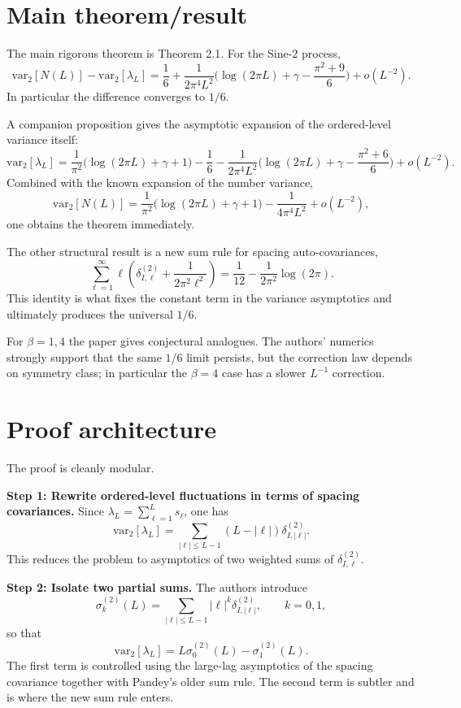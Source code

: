 \documentclass[11pt]{article}
\begin{document}
\section*{Main theorem/result}
The main rigorous theorem is Theorem 2.1. For the Sine-$2$ process,
\[
\mathrm{var}_2[N(L)]-\mathrm{var}_2[\lambda_L]
= \frac16 + \frac{1}{2\pi^4 L^2}\Big(\log(2\pi L)+\gamma-\frac{\pi^2+9}{6}\Big)+o(L^{-2}).
\]
In particular the difference converges to $1/6$.

A companion proposition gives the asymptotic expansion of the ordered-level variance itself:
\[
\mathrm{var}_2[\lambda_L]
= \frac{1}{\pi^2}\big(\log(2\pi L)+\gamma+1\big)-\frac16
-\frac{1}{2\pi^4L^2}\Big(\log(2\pi L)+\gamma-\frac{\pi^2+6}{6}\Big)+o(L^{-2}).
\]
Combined with the known expansion of the number variance,
\[
\mathrm{var}_2[N(L)]
=\frac{1}{\pi^2}\big(\log(2\pi L)+\gamma+1\big)-\frac{1}{4\pi^4L^2}+o(L^{-2}),
\]
one obtains the theorem immediately.

The other structural result is a new sum rule for spacing auto-covariances,
\[
\sum_{\ell=1}^{\infty} \ell\left(\delta^{(2)}_{I,\ell}+\frac{1}{2\pi^2\ell^2}\right)
= \frac{1}{12}-\frac{1}{2\pi^2}\log(2\pi).
\]
This identity is what fixes the constant term in the variance asymptotics and ultimately produces the universal $1/6$.

For $\beta=1,4$ the paper gives conjectural analogues. The authors' numerics strongly support that the same $1/6$ limit persists, but the correction law depends on symmetry class; in particular the $\beta=4$ case has a slower $L^{-1}$ correction.

\section*{Proof architecture}
The proof is cleanly modular.

\textbf{Step 1: Rewrite ordered-level fluctuations in terms of spacing covariances.}
Since $\lambda_L=\sum_{\ell=1}^L s_\ell$, one has
\[
\mathrm{var}_2[\lambda_L]=\sum_{|\ell|\le L-1}(L-|\ell|)\delta^{(2)}_{I,|\ell|}.
\]
This reduces the problem to asymptotics of two weighted sums of $\delta^{(2)}_{I,\ell}$.

\textbf{Step 2: Isolate two partial sums.}
The authors introduce
\[
\sigma_k^{(2)}(L)=\sum_{|\ell|\le L-1}|\ell|^k\delta^{(2)}_{I,|\ell|},\qquad k=0,1,
\]
so that
\[
\mathrm{var}_2[\lambda_L]=L\sigma_0^{(2)}(L)-\sigma_1^{(2)}(L).
\]
The first term is controlled using the large-lag asymptotics of the spacing covariance together with Pandey's older sum rule. The second term is subtler and is where the new sum rule enters.
\end{document}
